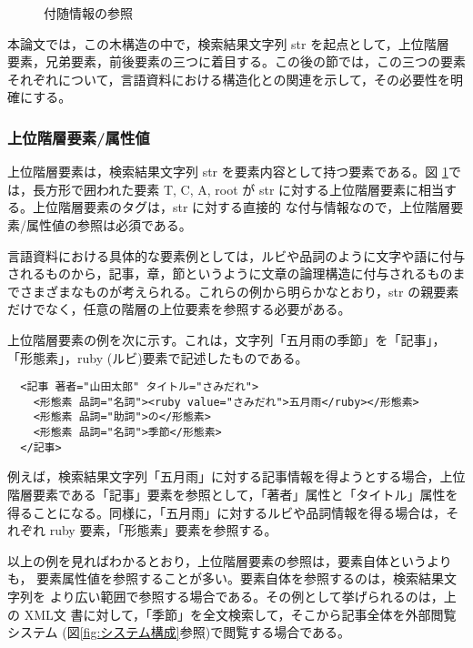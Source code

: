 \begin{figure}[hbt]
 \begin{center}
  \epsfxsize=10.5cm
  \caption{付随情報の参照}
  \label{fig:付随情報の参照}
 \end{center}   
\end{figure}

本論文では，この木構造の中で，検索結果文字列 str を起点として，上位階層
要素，兄弟要素，前後要素の三つに着目する。この後の節では，この三つの要素
それぞれについて，言語資料における構造化との関連を示して，その必要性を明
確にする。


\subsubsection{上位階層要素/属性値}
上位階層要素は，検索結果文字列 str を要素内容として持つ要素である。図
\ref{fig:付随情報の参照}では，長方形で囲われた要素 T, C, A, root が str
に対する上位階層要素に相当する。上位階層要素のタグは，str に対する直接的
な付与情報なので，上位階層要素/属性値の参照は必須である。

言語資料における具体的な要素例としては，ルビや品詞のように文字や語に付与
されるものから，記事，章，節というように文章の論理構造に付与されるものま
でさまざまなものが考えられる。これらの例から明らかなとおり，str の親要素
だけでなく，任意の階層の上位要素を参照する必要がある。

上位階層要素の例を次に示す。これは，文字列「五月雨の季節」を「記事」，
「形態素」，ruby (ルビ)要素で記述したものである。

\begin{verbatim}
  <記事 著者="山田太郎" タイトル="さみだれ">
    <形態素 品詞="名詞"><ruby value="さみだれ">五月雨</ruby></形態素>
    <形態素 品詞="助詞">の</形態素>
    <形態素 品詞="名詞">季節</形態素>
  </記事>
\end{verbatim}

例えば，検索結果文字列「五月雨」に対する記事情報を得ようとする場合，上位
階層要素である「記事」要素を参照として，「著者」属性と「タイトル」属性を
得ることになる。同様に，「五月雨」に対するルビや品詞情報を得る場合は，そ
れぞれ ruby 要素，「形態素」要素を参照する。

以上の例を見ればわかるとおり，上位階層要素の参照は，要素自体というよりも，
要素属性値を参照することが多い。要素自体を参照するのは，検索結果文字列を
より広い範囲で参照する場合である。その例として挙げられるのは，上の XML文
書に対して，「季節」を全文検索して，そこから記事全体を外部閲覧システム
(図\ref{fig:システム構成}参照)で閲覧する場合である。


